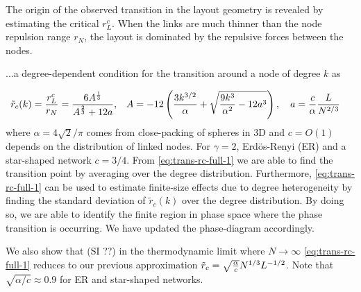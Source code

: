 \documentclass[linenumbers,endfloats,nofootinbib,preprint,floatfix,titlepage,superscriptaddress]{revtex4-1} %
\begin{document}
The origin of the observed transition in the layout geometry is revealed by estimating the critical $r_L^c$.
When the links are much thinner than the node repulsion range  $r_N$, the layout is dominated by the repulsive forces between the nodes. 
{\color{blue}
...a degree-dependent condition for the transition around a node of degree $k$ as  

\begin{align}
    \tilde{r}_c(k) = {r^c_L\over r_N} 
    &=\frac{6A^{{1\over 3}}}{A^{\frac{2}{3}} + 12 a}, &A& =- 12 \left({ 3k^{3/2}\over \alpha } + \sqrt{{ 9 k^{3}\over \alpha^2 }- 12 a^3 }\right),\quad a = {c\over \alpha}{L\over N^{2/3}} \label{eq:trans-rc-full-1}
\end{align}
where $\alpha = 4\sqrt{2}/\pi $ comes from close-packing of spheres in 3D and $c = O(1)$ depends on the distribution of linked nodes. 
For $\gamma = 2$, Erd\"os-Renyi (ER) and a star-shaped network $c = 3/4$. 
From \eqref{eq:trans-rc-full-1} we are able to find the transition point by averaging over the degree distribution. 
Furthermore, \eqref{eq:trans-rc-full-1} can be used to estimate finite-size effects due to degree heterogeneity by finding the standard deviation of $\tilde{r}_c(k)$ over the degree distribution. 
By doing so, we are able to identify the finite region in phase space where the phase transition is occurring. 
We have updated the phase-diagram accordingly. 


We also show that ({\color{red}SI ??}) in the thermodynamic limit where $N\to \infty$ \eqref{eq:trans-rc-full-1} reduces to our previous approximation $\tilde{r}_c = \sqrt{{\alpha \over c}} N^{1/3}L^{-1/2}$. 
Note that $\sqrt{\alpha/c} \approx 0.9$ for ER and star-shaped networks.

}
\end{document}
